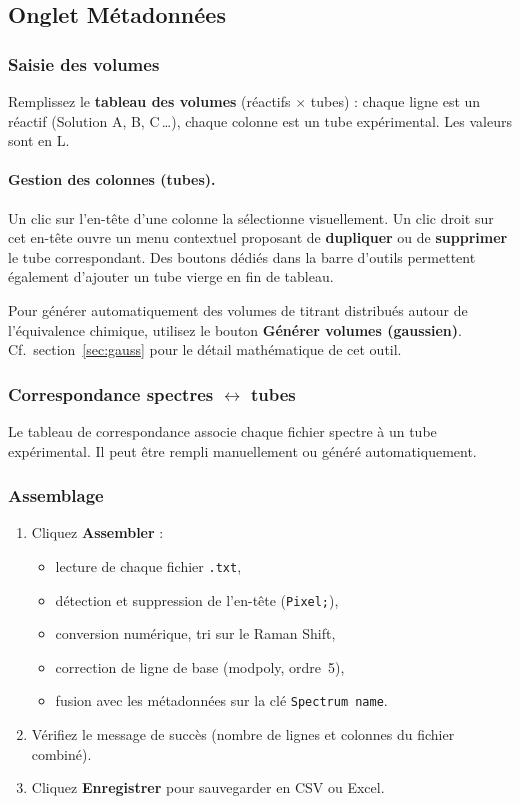 \documentclass[12pt, a4paper]{article}
\begin{document}
\subsection{Onglet Métadonnées}

\subsubsection{Saisie des volumes}

Remplissez le \textbf{tableau des volumes} (réactifs $\times$ tubes) :
chaque ligne est un réactif (Solution A, B, C\,\ldots), chaque colonne est
un tube expérimental. Les valeurs sont en \textmu{}L.

\paragraph{Gestion des colonnes (tubes).}
Un clic sur l'en-tête d'une colonne la sélectionne visuellement. Un clic
droit sur cet en-tête ouvre un menu contextuel proposant de \textbf{dupliquer}
ou de \textbf{supprimer} le tube correspondant. Des boutons dédiés dans la
barre d'outils permettent également d'ajouter un tube vierge en fin de
tableau.

Pour générer automatiquement des volumes de titrant distribués autour de
l'équivalence chimique, utilisez le bouton \textbf{Générer volumes (gaussien)}.
Cf.\ section~\ref{sec:gauss} pour le détail mathématique de cet outil.

\subsubsection{Correspondance spectres $\leftrightarrow$ tubes}

Le tableau de correspondance associe chaque fichier spectre à un tube
expérimental. Il peut être rempli manuellement ou généré automatiquement.

\subsubsection{Assemblage}

\begin{enumerate}
  \item Cliquez \textbf{Assembler} :
    \begin{itemize}
      \item lecture de chaque fichier \texttt{.txt},
      \item détection et suppression de l'en-tête (\texttt{Pixel;}),
      \item conversion numérique, tri sur le Raman Shift,
      \item correction de ligne de base (modpoly, ordre~5),
      \item fusion avec les métadonnées sur la clé \texttt{Spectrum name}.
    \end{itemize}
  \item Vérifiez le message de succès (nombre de lignes et colonnes du fichier
        combiné).
  \item Cliquez \textbf{Enregistrer} pour sauvegarder en CSV ou Excel.
\end{enumerate}
\end{document}
